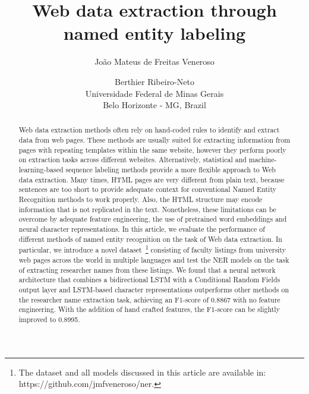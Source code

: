 \documentclass{nle}
\begin{document}
\title{Web data extraction through named entity labeling}

\author[João Mateus de Freitas Veneroso and Berthier Ribeiro-Neto]
       {João Mateus de Freitas Veneroso \and
        Berthier Ribeiro-Neto\\
	Universidade Federal de Minas Gerais\\
	Belo Horizonte - MG, Brazil}

% 

\begin{abstract}

Web data extraction methods often rely on hand-coded rules to 
identify and extract data from web pages. These methods are usually
suited for extracting information from pages with repeating templates within
the same website, however they perform poorly on extraction 
tasks across different websites. Alternatively, statistical and 
machine-learning-based sequence labeling methods provide a more flexible 
approach to Web data extraction. Many times, HTML pages are very different 
from plain text, because sentences are too short to provide adequate 
context for conventional Named Entity Recognition methods to work 
properly. Also, the HTML structure may encode information that is not 
replicated in the text. Nonetheless, these limitations can be overcome by
adequate feature engineering, the use of pretrained word 
embeddings and neural character representations. In this article, we 
evaluate the performance of different methods of named entity recognition 
on the task of Web data extraction. In particular, we introduce a novel 
dataset~\footnote{The dataset and all models discussed in this article are available in: https://github.com/jmfveneroso/ner.} 
consisting of faculty listings from university web pages across
the world in multiple languages and test the NER models on the task of 
extracting researcher names from these listings. We found that a 
neural network architecture that combines a bidirectional LSTM with
a Conditional Random Fields output layer and LSTM-based character 
representations outperforms other methods on the researcher name 
extraction task, achieving an F1-score of 0.8867 with no feature engineering. 
With the addition of hand crafted features, the F1-score can be slightly 
improved to 0.8995.

\end{abstract}
\end{document}
